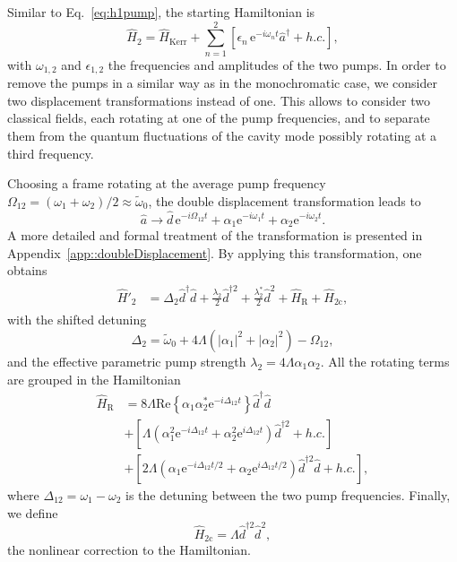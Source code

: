 \documentclass[pra,twocolumn,superscriptaddress]{revtex4-1}
\newcommand{\ah}[0]{\hat{a}}
\newcommand{\dhat}[0]{\hat{d}}
\newcommand{\Dtdp}[0]{\Delta_{\mathrm{2}}}
\newcommand{\ldp}[0]{\lambda_{\mathrm{2}}}
\newcommand{\corrDoublePump}[0]{\hat{H}_{\mathrm{2c}}}
\newcommand{\parS}[1]{\left[#1\right]}
\newcommand{\parO}[1]{\left(#1\right)}
\newcommand{\parC}[1]{\left\{#1\right\}}
\newcommand{\abs}[1]{\left|#1\right|}
\newcommand{\erm}[0]{\mathrm{e}}
\newcommand{\re}[1]{\mathrm{Re}\parC{#1}}
\begin{document}
Similar to Eq.~\eqref{eq:h1pump}, the starting Hamiltonian is 
\begin{equation}
		\hat{H}_{2} = 
	\hat{H}_{\mathrm{Kerr} }
	 + \sum_{n=1}^2 
	 \parS{
	 	\epsilon_n\, \erm^{-i \omega_{n} t} \ah^\dag 	
		 + h.c. 
	 },
	 \label{eq::HdoublePumpInitial}
\end{equation}
with $\omega_{1,2}$ and $\epsilon_{1,2}$ the frequencies and amplitudes of the two pumps. 
% 
In order to remove the pumps in a similar way as in the monochromatic case, we consider two displacement transformations instead of one. This allows to  consider two classical fields, each rotating at one of the pump frequencies, and to separate them from the quantum fluctuations of the cavity mode possibly rotating at a third frequency.

Choosing a frame rotating at the average pump frequency $\Omega_{12} = (\omega_1 + \omega_2)/2 \approx \tilde{\omega}_0$, the double displacement transformation leads to 
\begin{equation}
	\ah \rightarrow \dhat\, \erm^{-i \Omega_{12} t} + \alpha_1\erm^{-i \omega_1 t} + \alpha_2 \erm^{-i \omega_2 t}.
\end{equation}
A more detailed and formal treatment of the transformation is presented in Appendix~\ref{app::doubleDisplacement}.
By applying this transformation, one obtains
\begin{align}
\begin{split}
\label{eq::bichromaticPumpHamiltonianAfterDisplacement}
	\hat{H}'_{2} &= 
	 \Dtdp \dhat^\dagger \dhat +
	  \frac{\ldp}{2} \dhat^{\dagger 2}+ \frac{\ldp^*}{2} \dhat^{ 2}
	+
	\hat H_{\mathrm{R}}
	+ \corrDoublePump
	,
\end{split}
\end{align}
with the shifted detuning 
\begin{equation}
	\Dtdp = \tilde{\omega}_0  + 4\Lambda \parO{\abs{\alpha_1}^2+\abs{\alpha_2 }^2}  - \Omega_{12},
\end{equation}
 and the effective parametric pump strength $\ldp = 4 \Lambda \alpha_1 \alpha_2$. 
 All the rotating terms are grouped in the Hamiltonian 
\begin{align}
	\hat H_{\mathrm{R}}
		&=
		8 \Lambda  \re{\alpha_1 \alpha_2^* \erm^{-i \Delta_{12} t}} 
		\dhat^\dagger \dhat
		\nonumber \\ &  +
		\parS{
			\Lambda \parO{\alpha_1^2 \erm^{-i \Delta_{12} t}+\alpha_2^2 \erm^{i \Delta_{12} t}} 
			\dhat^{\dagger 2}
			+ h.c.
		}
		\\ &  +
		\parS{
			 2 \Lambda \parO{\alpha_1 \erm^{-i \Delta_{12}t/2} + \alpha_2 \erm^{i \Delta_{12} t/2} }\dhat^{\dagger 2}\dhat
			+ h.c.
		},
		\nonumber
\end{align}
where $\Delta_{12} = \omega_1-\omega_2$ is the detuning between the two pump frequencies.
Finally, we define
\begin{equation}
	 \corrDoublePump = \Lambda \dhat^{\dagger 2}\dhat^2,
\end{equation}
 the nonlinear correction to the Hamiltonian.
\end{document}
